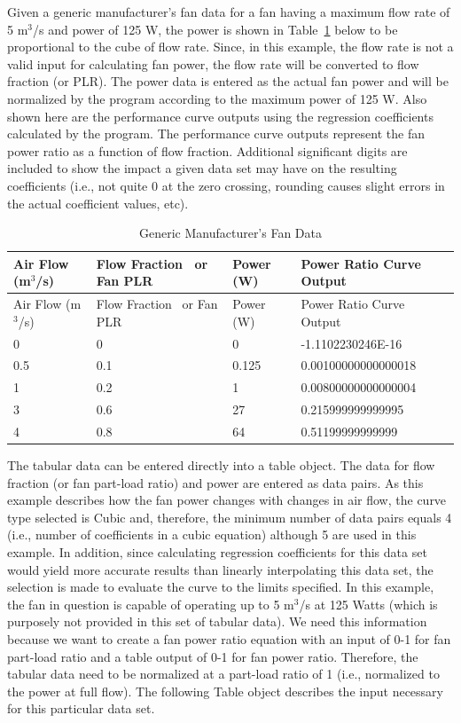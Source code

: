 Given a generic manufacturer's fan data for a fan having a maximum flow rate of 5 m\(^3\)/s and power of 125 W, the power is shown in Table~\ref{table:generic-manufacturers-fan-data} below to be proportional to the cube of flow rate. Since, in this example, the flow rate is not a valid input for calculating fan power, the flow rate will be converted to flow fraction (or PLR). The power data is entered as the actual fan power and will be normalized by the program according to the maximum power of 125 W. Also shown here are the performance curve outputs using the regression coefficients calculated by the program. The performance curve outputs represent the fan power ratio as a function of flow fraction. Additional significant digits are included to show the impact a given data set may have on the resulting coefficients (i.e., not quite 0 at the zero crossing, rounding causes slight errors in the actual coefficient values, etc).

\begin{longtable}[c]{p{1.5in}p{1.5in}p{1.2in}p{1.8in}}
\caption{Generic Manufacturer's Fan Data \label{table:generic-manufacturers-fan-data}} \tabularnewline
\toprule 
Air Flow (m\(^3\)/s) & Flow Fraction~ or Fan PLR & Power (W) & Power Ratio Curve Output \tabularnewline
\midrule
\endfirsthead

\toprule
Air Flow (m\(^3\)/s) & Flow Fraction~ or Fan PLR & Power (W) & Power Ratio Curve Output \tabularnewline
\midrule
\endhead

0 & 0 & 0 & -1.1102230246E-16 \tabularnewline
0.5 & 0.1 & 0.125 & 0.00100000000000018 \tabularnewline
1 & 0.2 & 1 & 0.00800000000000004 \tabularnewline
3 & 0.6 & 27 & 0.215999999999995 \tabularnewline
4 & 0.8 & 64 & 0.51199999999999 \tabularnewline
\bottomrule
\end{longtable}

The tabular data can be entered directly into a table object. The data for flow fraction (or fan part-load ratio) and power are entered as data pairs. As this example describes how the fan power changes with changes in air flow, the curve type selected is Cubic and, therefore, the minimum number of data pairs equals 4 (i.e., number of coefficients in a cubic equation) although 5 are used in this example. In addition, since calculating regression coefficients for this data set would yield more accurate results than linearly interpolating this data set, the selection is made to evaluate the curve to the limits specified. In this example, the fan in question is capable of operating up to 5 m\(^3\)/s at 125 Watts (which is purposely not provided in this set of tabular data). We need this information because we want to create a fan power ratio equation with an input of 0-1 for fan part-load ratio and a table output of 0-1 for fan power ratio. Therefore, the tabular data need to be normalized at a part-load ratio of 1 (i.e., normalized to the power at full flow). The following Table object describes the input necessary for this particular data set.

